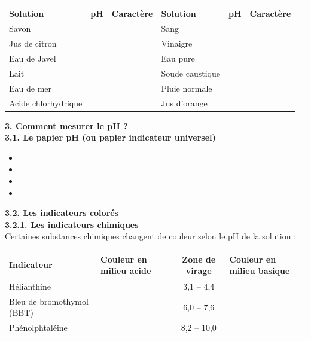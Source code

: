 \documentclass[11pt,a4paper]{article}
\renewcommand{\arraystretch}{2}
\newcommand{\trou}{\dotfill}
\begin{document}
\begin{center}
{\renewcommand{\arraystretch}{2.4}
\begin{tabular}{|l|c|l||l|c|l|}
\hline
\textbf{Solution} & \textbf{pH} & \textbf{Caractère} & \textbf{Solution} & \textbf{pH} & \textbf{Caractère} \\
\hline
Savon & & & Sang & & \\
\hline
Jus de citron & & & Vinaigre & & \\
\hline
Eau de Javel & & & Eau pure & & \\
\hline
Lait & & & Soude caustique & & \\
\hline
Eau de mer & & & Pluie normale & & \\
\hline
Acide chlorhydrique & & & Jus d'orange & & \\
\hline
\end{tabular}}
\end{center}

\vspace{3mm}

\newpage

\textbf{3. Comment mesurer le pH ?} \\

\textbf{3.1. Le papier pH (ou papier indicateur universel)}

\begin{tcolorbox}[colback=red!5!white,colframe=red!75!black]
{
\vspace{8mm}
\begin{itemize}
    \item \trou \vspace{3mm}
    \item \trou \vspace{3mm}
    \item \trou \vspace{3mm}
    \item \trou
\end{itemize}
}
\end{tcolorbox}

\textbf{3.2. Les indicateurs colorés} \\

\textbf{3.2.1. Les indicateurs chimiques} \\

Certaines substances chimiques changent de couleur selon le pH de la solution :

\vspace{2mm}

\begin{tabular}{|l|>{\centering\arraybackslash}p{4cm}|c|>{\centering\arraybackslash}p{3.9cm}|}
\hline
\textbf{Indicateur} & \textbf{Couleur en milieu acide} & \textbf{Zone de virage} & \textbf{Couleur en milieu basique} \\
\hline
Hélianthine & & 3,1 -- 4,4 & \\
\hline
Bleu de bromothymol (BBT) & & 6,0 -- 7,6 & \\
\hline
Phénolphtaléine & & 8,2 -- 10,0 & \\
\hline
\end{tabular}
\end{document}
